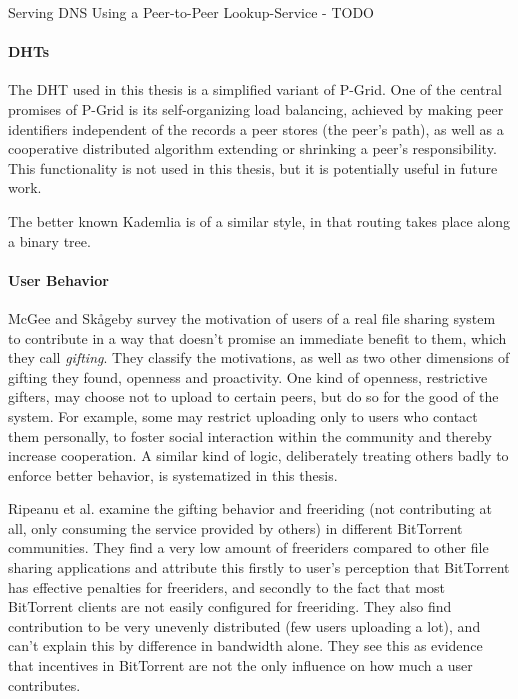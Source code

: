 \cite{cox2002serving}
Serving DNS Using a Peer-to-Peer Lookup-Service
- TODO

\paragraph{DHTs}
The \ac{DHT} used in this thesis is a simplified variant of
P-Grid\cite{aberer2001pgrid}. One of the central promises of P-Grid is its
self-organizing load balancing, achieved by making peer identifiers independent
of the records a peer stores (the peer's path), as well as a cooperative
distributed algorithm extending or shrinking a peer's responsibility. This
functionality is not used in this thesis, but it is potentially useful in future
work.

The better known Kademlia\cite{maymounkov2002kademlia} is of a similar style, in
that routing takes place along a binary tree.

\paragraph{User Behavior}
McGee and Sk{\aa}geby\cite{mcgee2004gifting} survey the motivation of users of a
real file sharing system to contribute in a way that doesn't promise an
immediate benefit to them, which they call \emph{gifting}. They classify the
motivations, as well as two other dimensions of gifting they found, openness and
proactivity. One kind of openness, restrictive gifters, may choose not to upload
to certain peers, but do so for the good of the system. For example, some may
restrict uploading only to users who contact them personally, to foster social
interaction within the community and thereby increase cooperation. A similar
kind of logic, deliberately treating others badly to enforce better behavior, is
systematized in this thesis.

Ripeanu et al.\cite{ripeanu2006gifting} examine the gifting behavior and
freeriding (not contributing at all, only consuming the service provided by
others) in different BitTorrent communities. They find a very low amount of
freeriders compared to other file sharing applications and attribute this
firstly to user's perception that BitTorrent has effective penalties for
freeriders, and secondly to the fact that most BitTorrent clients are not easily
configured for freeriding. They also find contribution to be very unevenly
distributed (few users uploading a lot), and can't explain this by difference in
bandwidth alone. They see this as evidence that incentives in BitTorrent are not
the only influence on how much a user contributes.


